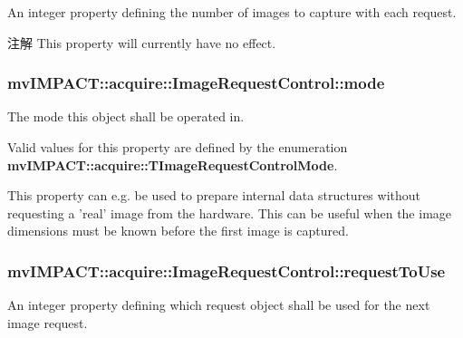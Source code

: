 An integer property defining the number of images to capture with each request. 

\begin{DoxyNote}{注解}
This property will currently have no effect. 
\end{DoxyNote}
\hypertarget{classmv_i_m_p_a_c_t_1_1acquire_1_1_image_request_control_a4fb0601747fb8feca1eaaed923faab37}{
\subsubsection[{mode}]{ mv\+I\+M\+P\+A\+C\+T\+::acquire\+::\+Image\+Request\+Control\+::mode}}\label{classmv_i_m_p_a_c_t_1_1acquire_1_1_image_request_control_a4fb0601747fb8feca1eaaed923faab37}


The mode this object shall be operated in. 

Valid values for this property are defined by the enumeration {\bfseries mv\+I\+M\+P\+A\+C\+T\+::acquire\+::\+T\+Image\+Request\+Control\+Mode}.

This property can e.\+g. be used to prepare internal data structures without requesting a 'real' image from the hardware. This can be useful when the image dimensions must be known before the first image is captured. \hypertarget{classmv_i_m_p_a_c_t_1_1acquire_1_1_image_request_control_acb01d358421ecad7b28f3de692c4868d}{
\subsubsection[{request\+To\+Use}]{ mv\+I\+M\+P\+A\+C\+T\+::acquire\+::\+Image\+Request\+Control\+::request\+To\+Use}}\label{classmv_i_m_p_a_c_t_1_1acquire_1_1_image_request_control_acb01d358421ecad7b28f3de692c4868d}


An integer property defining which request object shall be used for the next image request. 

